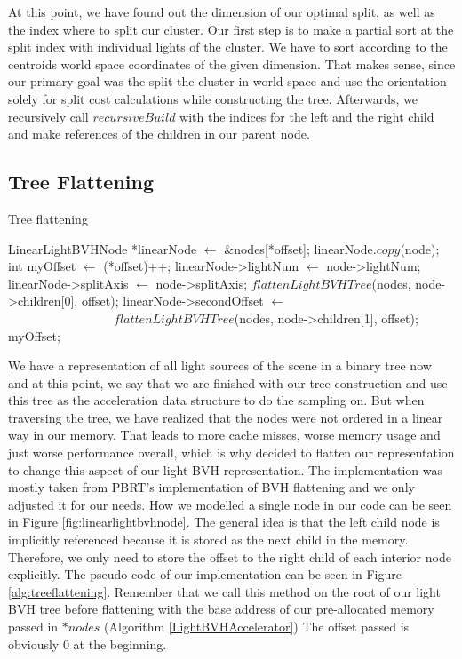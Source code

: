 At this point, we have found out the dimension of our optimal split, as well as the index where to split our cluster. Our first step is to make a partial sort at the split index with individual lights of the cluster. We have to sort according to the centroids world space coordinates of the given dimension. That makes sense, since our primary goal was the split the cluster in world space and use the orientation solely for split cost calculations while constructing the tree. Afterwards, we recursively call $recursiveBuild$ with the indices for the left and the right child and make references of the children in our parent node.

\subsection{Tree Flattening}
\label{subs:flat}

\begin{algorithm}
	\caption{Tree flattening}
	\label{alg:treeflattening}
	\begin{algorithmic}[1] %
		\State LinearLightBVHNode *linearNode $\gets$ \&nodes[*offset];
		\State linearNode.$copy$(node);
		\State int myOffset $\gets$ (*offset)++;
		\State linearNode->lightNum $\gets$ node->lightNum;
		\Else
		\State linearNode->splitAxis $\gets$ node->splitAxis;
		\State $flattenLightBVHTree$(nodes, node->children[0], offset);
		\State linearNode->secondOffset $\gets$ \\ \ \ \ \ \ \ \ \ \ \ \ \ \ \ \ \ \ $flattenLightBVHTree$(nodes, node->children[1], offset);
		\EndIf
		\State \Return myOffset;
		\EndProcedure
	\end{algorithmic}
\end{algorithm}

We have a representation of all light sources of the scene in a binary tree now and at this point, we say that we are finished with our tree construction and use this tree as the acceleration data structure to do the sampling on. But when traversing the tree, we have realized that the nodes were not ordered in a linear way in our memory. That leads to more cache misses, worse memory usage and just worse performance overall, which is why decided to flatten our representation to change this aspect of our light BVH representation. The implementation was mostly taken from PBRT's implementation of BVH flattening and we only adjusted it for our needs. How we modelled a single node in our code can be seen in Figure \ref{fig:linearlightbvhnode}. The general idea is that the left child node is implicitly referenced because it is stored as the next child in the memory. Therefore, we only need to store the offset to the right child of each interior node explicitly. The pseudo code of our implementation can be seen in Figure \ref{alg:treeflattening}. Remember that we call this method on the root of our light BVH tree before flattening with the base address of our pre-allocated memory passed in $*nodes$ (Algorithm \ref{LightBVHAccelerator}) The offset passed is obviously 0 at the beginning.

